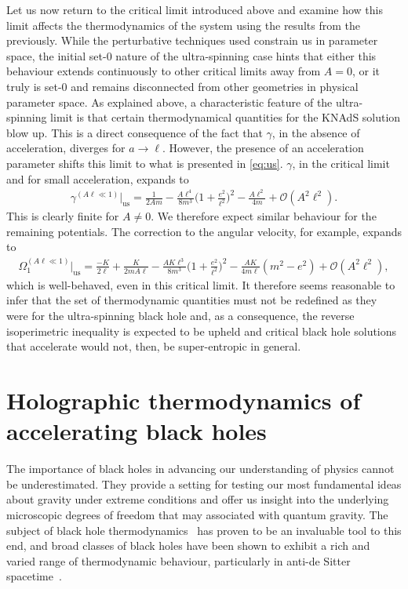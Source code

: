 \documentclass[
twoside,
openright,
frontopenright,
]{dmathesis}
\begin{document}
Let us now return to the critical limit introduced above and examine how this
limit affects the thermodynamics of the system using the results from the
previously. While the perturbative techniques used constrain us in parameter
space, the initial set-0 nature of the ultra-spinning case hints that either
this behaviour extends continuously to other critical limits away from $A=0$, or
it truly is set-0 and remains disconnected from other geometries in physical
parameter space. As explained above, a characteristic feature of the
ultra-spinning limit is that certain thermodynamical quantities for the KNAdS
solution blow up. This is a direct consequence of the fact that $\gamma$, in the
absence of acceleration, diverges for $a\to\ell$. However, the presence of an
acceleration parameter shifts this limit to what is presented in
\cref{eq:us}. $\gamma$, in the critical limit and for small acceleration,
expands to
\begin{align}
\gamma^{(A\ell\ll 1)}\Big|_{\mathrm{us}}=\frac{1}{2Am} - \frac{A\ell^4}{8m^3}\Big(1+\frac{e^2}{\ell^2}\Big)^2-\frac{A\ell^2}{4m}+\mathcal{O}(A^2\ell^2).
\end{align}
This is clearly finite for $A\neq 0$. We therefore expect similar behaviour for
the remaining potentials. The correction to the angular velocity, for example,
expands to
\begin{align}
\Omega_1^{(A\ell\ll 1)}\Big|_{\mathrm{us}} = \frac{-K}{2\ell}+\frac{K}{2mA\ell}-\frac{A K\ell^3}{8m^3}\Big(1+\frac{e^2}{\ell^2}\Big)^2-\frac{A K}{4 m\ell}(m^2-e^2)+\mathcal{O}(A^2\ell^2),
\end{align}
which is well-behaved, even in this critical limit. It therefore seems
reasonable to infer that the set of thermodynamic quantities must not be
redefined as they were for the ultra-spinning black hole and, as a consequence,
the reverse isoperimetric inequality is expected to be upheld and critical black
hole solutions that accelerate would not, then, be super-entropic in general.

\chapter{Holographic thermodynamics of accelerating black holes}
\label{chap:holoTD} 

The importance of black holes in advancing our understanding of physics cannot
be underestimated.  They provide a setting for testing our most fundamental
ideas about gravity under extreme conditions and offer us insight into the
underlying microscopic degrees of freedom that may associated with quantum
gravity.  The subject of black hole thermodynamics~\cite{Bekenstein:1973ur,
  Bekenstein:1974ax,Hawking:1974sw} has proven to be an invaluable tool to this
end, and broad classes of black holes have been shown to exhibit a rich and
varied range of thermodynamic behaviour, particularly in anti-de Sitter
spacetime~\cite{Kubiznak:2016qmn}.
\end{document}
